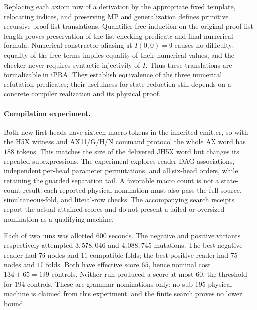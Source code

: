Replacing each axiom row of a derivation by the appropriate fixed template,
relocating indices, and preserving MP and generalization defines primitive
recursive proof-list translations. Quantifier-free induction on the
original proof-list length proves preservation of the list-checking
predicate and final numerical formula. Numerical constructor aliasing at
$I(0,0)=0$ causes no difficulty: equality of the free terms implies equality
of their numerical values, and the checker never requires syntactic
injectivity of $I$. Thus these translations are formalizable in iPRA.
They establish equivalence of the three numerical refutation predicates;
their usefulness for state reduction still depends on a concrete compiler
realization and its physical proof.

\paragraph{Compilation experiment.}
Both new first heads have sixteen macro tokens in the inherited emitter,
so with the H5X witness and AX11/G/H/N command protocol the whole AX word
has $188$ tokens. This matches the size of the delivered JH5X word but
changes its repeated subexpressions. The experiment explores reader-DAG
associations, independent per-head parameter permutations, and all six-head
orders, while retaining the guarded separation tail. A favorable macro
count is not a state-count result: each reported physical nomination must
also pass the full source, simultaneous-fold, and literal-row checks.
The accompanying search receipts report the actual attained scores and do
not present a failed or oversized nomination as a qualifying machine.


Each of two runs was allotted $600$ seconds. The negative and positive
variants respectively attempted $3{,}578{,}046$ and $4{,}088{,}745$
mutations. The best negative reader had $76$ nodes and $11$ compatible
folds; the best positive reader had $75$ nodes and $10$ folds. Both have
effective score $65$, hence nominal cost $134+65=199$ controls. Neither
run produced a score at most $60$, the threshold for $194$ controls.
These are grammar nominations only: no sub-$195$ physical machine is
claimed from this experiment, and the finite search proves no lower bound.
